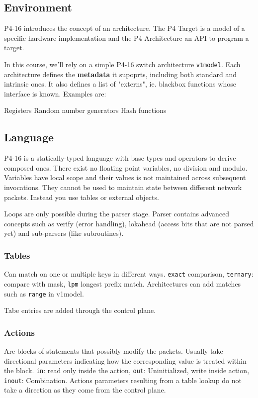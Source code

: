 \documentclass[a4paper, fontsize=8pt, landscape, DIV=1]{scrartcl}
\begin{document}
\begin{multicols*}{4}

  \subsection{Environment}
  P4-16 introduces the concept of an architecture. The P4 Target is a model 
  of a specific hardware implementation and the P4 Architecture an API to
  program a target.


  In this course, we'll rely on a simple P4-16 switch architecture \texttt{v1model}.
  Each architecture defines the \textbf{metadata} it supoprts, including both standard and 
  intrinsic ones. It also defines a list of "externs", ie. blackbox functions whose interface
  is known. Examples are:
  \begin{outline}
   \1 Registers
   \1 Random number generators
   \1 Hash functions
  \end{outline}

  \subsection{Language}
  P4-16 is a statically-typed language with base types and operators to derive composed ones.
  There exist no floating point variables, no division and modulo. Variables have local scope and
  their values is not maintained across subsequent invocations. They cannot be used to
  maintain state between different network packets. Instead you use tables or external
  objects.

  Loops are only possible during the parser stage. Parser contains advanced concepts such as
  verify (error handling), lokahead (access bits that are not parsed yet) and sub-parsers
  (like subroutines).

  \subsubsection{Tables}
  Can match on one or multiple keys in different ways. \texttt{exact}
  comparison, \texttt{ternary}: compare with mask, \texttt{lpm} longest prefix match.
  Architectures can add matches such as \texttt{range} in v1model.

  Tabe entries are added through the control plane.
  
  \subsubsection{Actions}
  Are blocks of statements that possibly modify the packets. Usually take directional
  parameters indicating how the corresponding value is treated within the block.
  \texttt{in}: read only inside the action, \texttt{out}: Uninitialized, write inside action,
  \texttt{inout}: Combination. Actions parameters resulting from a table lookup do not 
  take a direction as they come from the control plane.


\end{multicols*}
\end{document}
